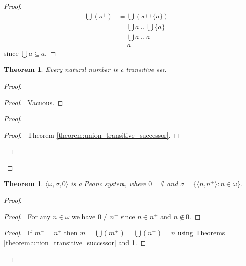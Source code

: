 \documentclass{article}
\let\qed\relax
\newtheorem{theorem}[axiom]{Theorem}
\theoremstyle{definition}
\newcommand{\ran}{\ensuremath{\operatorname{ran}}}
\begin{document}
    \begin{proof}
        \pf
        \begin{align*}
            \bigcup (a^+) & = \bigcup (a \cup \{ a \}) \\
            & = \bigcup a \cup \bigcup \{a\} \\
            & = \bigcup a \cup a \\
            & = a
        \end{align*}
        since $\bigcup a \subseteq a$. \qed
    \end{proof}

    \begin{theorem}
        \label{theorem:natural_number_transitive}
        Every natural number is a transitive set.
    \end{theorem}

    \begin{proof}
        \pf
        \begin{proof}
            \pf\ Vacuous.
        \end{proof}
        \begin{proof}
            \begin{proof}
                \pf\ Theorem \ref{theorem:union_transitive_successor}.
            \end{proof}
        \end{proof}
        \qed
    \end{proof}

    \begin{theorem}
        $\langle \omega, \sigma, 0 \rangle$ is a Peano system, where $0 = \emptyset$ and 
        $\sigma = \{ \langle n, n^+ \rangle : n \in \omega \}$.
    \end{theorem}

    \begin{proof}
        \pf
        \step{1}{$0 \notin \ran \sigma$}
        \begin{proof}
            \pf\ For any $n \in \omega$ we have $0 \neq n^+$ since $n \in n^+$
            and $n \notin 0$.
        \end{proof}
        \begin{proof}
            \pf\ If $m^+ = n^+$ then $m = \bigcup (m^+) = \bigcup (n^+) = n$ using Theorems
            \ref{theorem:union_transitive_successor} and \ref{theorem:natural_number_transitive}.
        \end{proof}
        \qed
    \end{proof}
\end{document}
